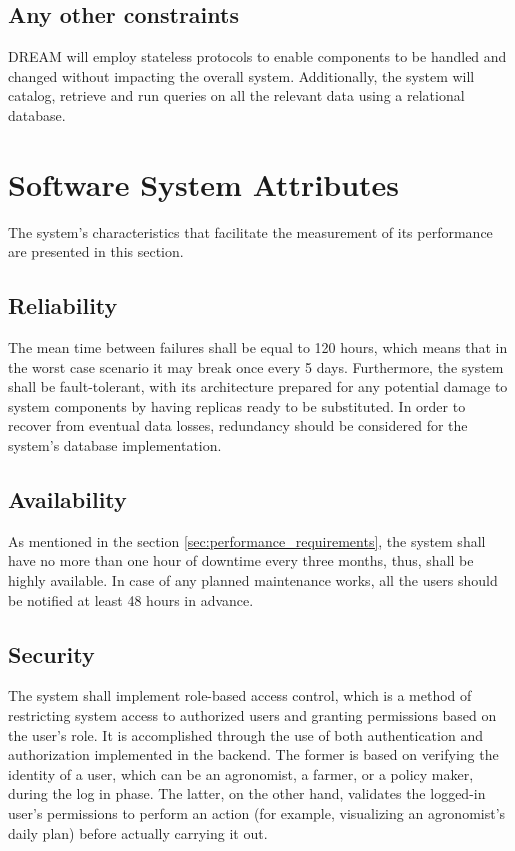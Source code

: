 \subsection{Any other constraints}

DREAM will employ stateless protocols to enable components to be handled and changed without impacting the overall system. Additionally, the system will catalog, retrieve and run queries on all the relevant data using a relational database.

\section{Software System Attributes}

The system's characteristics that facilitate the measurement of its performance are presented in this section.

\subsection{Reliability}

The mean time between failures shall be equal to 120 hours, which means that in the worst case scenario it may break once every 5 days. Furthermore, the system shall be fault-tolerant, with its architecture prepared for any potential damage to system components by having replicas ready to be substituted. In order to recover from eventual data losses, redundancy should be considered for the system's database implementation.

\subsection{Availability}

As mentioned in the section \ref{sec:performance_requirements}, the system shall have no more than one hour of downtime every three months, thus, shall be highly available. In case of any planned maintenance works, all the users should be notified at least 48 hours in advance.

\subsection{Security}

The system shall implement role-based access control, which is a method of restricting system access to authorized users and granting permissions based on the user's role. It is accomplished through the use of both authentication and authorization implemented in the backend. The former is based on verifying the identity of a user, which can be an agronomist, a farmer, or a policy maker, during the log in phase. The latter, on the other hand, validates the logged-in user's permissions to perform an action (for example, visualizing an agronomist's daily plan) before actually carrying it out.

